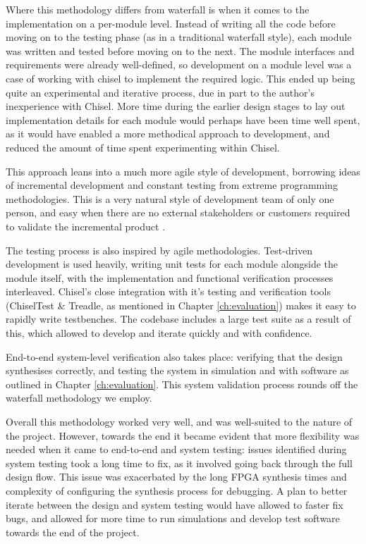 Where this methodology differs from waterfall is when it comes to the implementation on a per-module level. Instead of writing all the code before moving on to the testing phase (as in a traditional waterfall style), each module was written and tested before moving on to the next. The module interfaces and requirements were already well-defined, so development on a module level was a case of working with chisel to implement the required logic. This ended up being quite an experimental and iterative process, due in part to the author's inexperience with Chisel. More time during the earlier design stages to lay out implementation details for each module would perhaps have been time well spent, as it would have enabled a more methodical approach to development, and reduced the amount of time spent experimenting within Chisel.

This approach leans into a much more agile style of development, borrowing ideas of incremental development and constant testing from extreme programming methodologies. This is a very natural style of development team of only one person, and easy when there are no external stakeholders or customers required to validate the incremental product \cite{softeng}.

The testing process is also inspired by agile methodologies. Test-driven development is used heavily, writing unit tests for each module alongside the module itself, with the implementation and functional verification processes interleaved. Chisel's close integration with it's testing and verification tools (ChiselTest \& Treadle, as mentioned in Chapter \ref{ch:evaluation}) makes it easy to rapidly write testbenches. The codebase includes a large test suite as a result of this, which allowed to develop and iterate quickly and with confidence.

End-to-end system-level verification also takes place: verifying that the design synthesises correctly, and testing the system in simulation and with software as outlined in Chapter \ref{ch:evaluation}. This system validation process rounds off the waterfall methodology we employ.

Overall this methodology worked very well, and was well-suited to the nature of the project. However, towards the end it became evident that more flexibility was needed when it came to end-to-end and system testing: issues identified during system testing took a long time to fix, as it involved going back through the full design flow. This issue was exacerbated by the long FPGA synthesis times and complexity of configuring the synthesis process for debugging. A plan to better iterate between the design and system testing would have allowed to faster fix bugs, and allowed for more time to run simulations and develop test software towards the end of the project.



